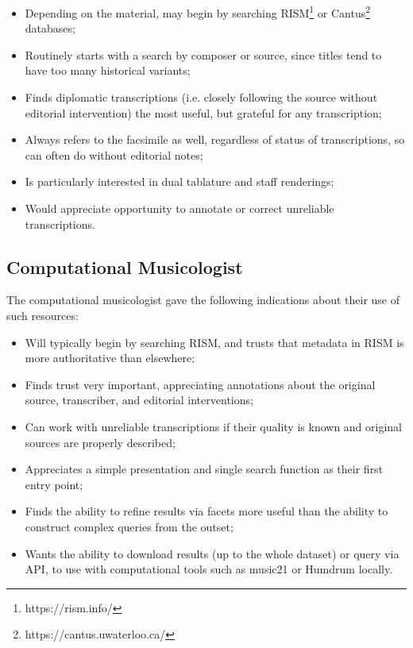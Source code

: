 \documentclass[twocolumn,10pt]{paper}
\begin{document}
\begin{sloppypar}
  \begin{itemize}
    \item Depending on the material, may begin by searching
      RISM\footnote{https://rism.info/} or
      Cantus\footnote{https://cantus.uwaterloo.ca/} databases;
    \item Routinely starts with a search by composer or source, since
      titles tend to have too many historical variants;
    \item Finds diplomatic transcriptions (i.e. closely following
      the source without editorial intervention) the most useful,
      but grateful for any transcription;
    \item Always refers to the facsimile as well, regardless of status
      of transcriptions, so can often do without editorial notes;
    \item Is particularly interested in dual tablature and staff
      renderings;
    \item Would appreciate opportunity to annotate or correct
      unreliable transcriptions.
  \end{itemize}
  
  \subsection{Computational Musicologist}

  The computational musicologist gave the following indications about
  their use of such resources:

  \begin{itemize}
  \item Will typically begin by searching RISM, and trusts that
    metadata in RISM is more authoritative than elsewhere;
  \item Finds trust very important, appreciating annotations about the
    original source, transcriber, and editorial interventions;
  \item Can work with unreliable transcriptions if their quality is
    known and original sources are properly described;
  \item Appreciates a simple presentation and single search function
    as their first entry point;
  \item Finds the ability to refine results via facets more useful
    than the ability to construct complex queries from the outset;
  \item Wants the ability to download results (up to the whole
    dataset) or query via API, to use with computational tools such
    as music21 or Humdrum locally.
  \end{itemize}
  

\end{sloppypar}
\end{document}
